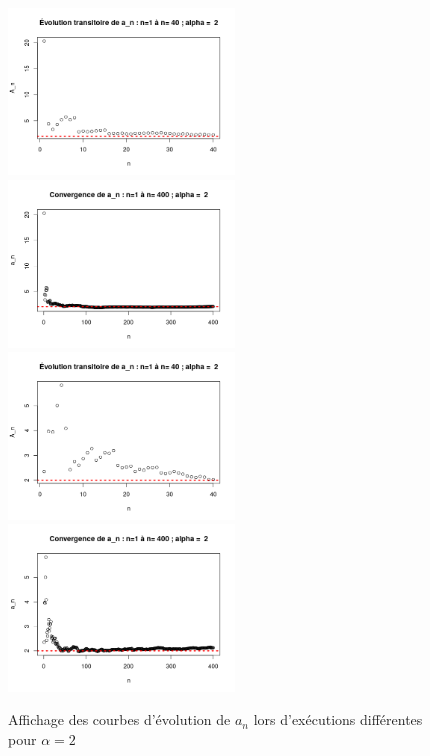 \documentclass{article}
\begin{document}
\begin{figure}[!h]
\begin{center}
\includegraphics[width=6cm]{plot_graphique_transi_1}
\includegraphics[width=6cm]{plot_graphique_conv_1}
\includegraphics[width=6cm]{plot_graphique_transi_2}
\includegraphics[width=6cm]{plot_graphique_conv_2}
\caption{Affichage des courbes d'évolution de $a_n$ lors d'exécutions différentes pour $\alpha=2$}
\end{center}
\end{figure}

\clearpage
\end{document}
